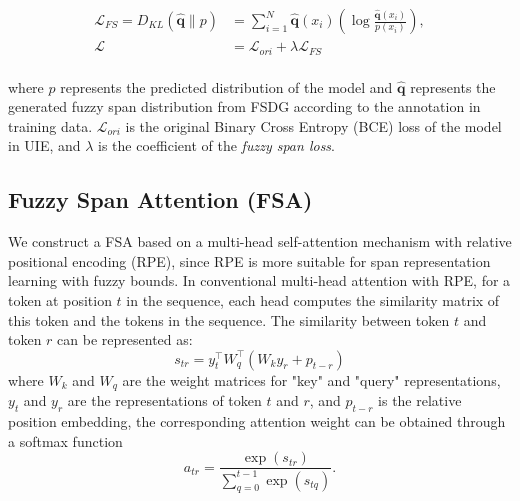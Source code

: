 \documentclass[11pt]{article}
\begin{document}
\begin{equation*}
    \begin{aligned}
    \mathcal{L}_{FS}=D_{K L}(\mathbf{\hat{q}} \| p)&=\sum_{i=1}^{N} \mathbf{\hat{q}}\left(x_{i}\right)\left(\log \frac{\mathbf{\hat{q}}\left(x_{i}\right)}{p\left(x_{i}\right)}\right), \\
    \mathcal{L}&=\mathcal{L}_{ori}+\lambda \mathcal{L}_{FS} \\
    \end{aligned}
\end{equation*}


where $p$ represents the predicted distribution of the model and
$\mathbf{\hat{q}}$
represents the generated fuzzy span distribution from FSDG according to the annotation in training data. $\mathcal{L}_{ori}$ is the original Binary Cross Entropy (BCE) loss of the model in UIE, and $\lambda$ is the coefficient of the \textit{fuzzy span loss}.


\subsection{Fuzzy Span Attention (FSA)}



We construct a FSA based on a multi-head self-attention mechanism with relative positional encoding (RPE), since RPE is more suitable for span representation learning with fuzzy bounds. In conventional multi-head attention with RPE, for a token at position $t$ in the sequence, each head computes the similarity matrix of this token and the tokens in the sequence. The similarity between token $t$ and token $r$ can be represented as:
\begin{equation}
s_{t r}=y_{t}^{\top} W_{q}^{\top}\left(W_{k} y_{r}+p_{t-r}\right)
\end{equation}
where $W_k$ and $W_q$ are the weight matrices for "key" and "query" representations, $y_t$ and $y_r$ are the representations of token $t$ and $r$, and $p_{t-r}$ is the relative position embedding, the corresponding attention weight can be obtained through a softmax function
\begin{equation}
    a_{t r}=\frac{\exp \left(s_{t r}\right)}{\sum_{q=0}^{t-1} \exp \left(s_{t q}\right)}.
\end{equation}
\end{document}
